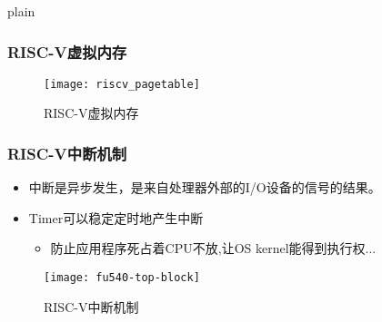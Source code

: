 \begin{frame}{plain}
	
	\frametitle{RISC-V虚拟内存}
	
	\begin{figure}
		\centering
		\texttt{[image: riscv\_pagetable]}
		\caption{RISC-V虚拟内存}
	\end{figure}
	
	
\end{frame}


\begin{frame}
	\frametitle{RISC-V中断机制}
	\begin{itemize}
		\item 中断是异步发生，是来自处理器外部的I/O设备的信号的结果。
		
		
		\item Timer可以稳定定时地产生中断
		\begin{itemize}
			\item 防止应用程序死占着CPU不放,让OS kernel能得到执行权...
		\end{itemize}				
		
	\end{itemize}

	\begin{figure}
	\centering
	\texttt{[image: fu540-top-block]}
	\caption{RISC-V中断机制}
\end{figure}

\end{frame}



